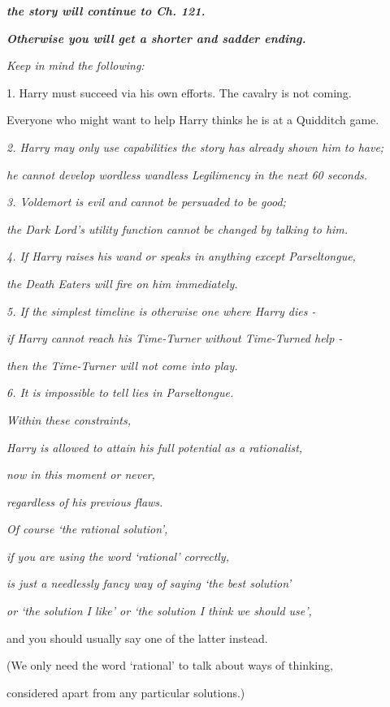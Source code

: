 \emph{\textbf{the story will continue to Ch. 121.}}

\emph{\textbf{Otherwise you will get a shorter and sadder ending.}}

\emph{Keep in mind the following:}

1. Harry must succeed via his own efforts. The cavalry is not coming.

Everyone who might want to help Harry thinks he is at a Quidditch game.

\emph{2. Harry may only use capabilities the story has already shown him to have;}

\emph{he cannot develop wordless wandless Legilimency in the next 60 seconds.}

\emph{3. Voldemort is evil and cannot be persuaded to be good;}

\emph{the Dark Lord's utility function cannot be changed by talking to him.}

\emph{4. If Harry raises his wand or speaks in anything except Parseltongue,}

\emph{the Death Eaters will fire on him immediately.}

\emph{5. If the simplest timeline is otherwise one where Harry dies -}

\emph{if Harry cannot reach his Time-Turner without Time-Turned help -}

\emph{then the Time-Turner will not come into play.}

\emph{6. It is impossible to tell lies in Parseltongue.}

\emph{Within these constraints,}

\emph{Harry is allowed to attain his full potential as a rationalist,}

\emph{now in this moment or never,}

\emph{regardless of his previous flaws.}

\emph{Of course `the rational solution',}

\emph{if you are using the word `rational' correctly,}

\emph{is just a needlessly fancy way of saying `the best solution'}

\emph{or `the solution I like' or `the solution I think we should use',}

and you should usually say one of the latter instead.

(We only need the word `rational' to talk about ways of thinking,

considered apart from any particular solutions.)

